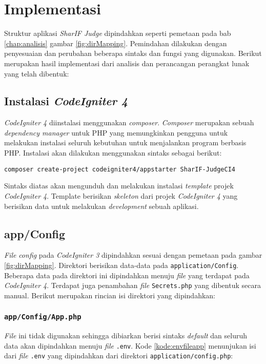 \section{Implementasi}
Struktur aplikasi \textit{SharIF Judge} dipindahkan seperti pemetaan pada bab \ref{chap:analisis} gambar \ref{fig:dirMapping}. Pemindahan dilakukan dengan penyesuaian dan perubahan beberapa sintaks dan fungsi yang digunakan. Berikut merupakan hasil implementasi dari analisis dan perancangan perangkat lunak yang telah dibentuk:
\subsection{Instalasi \textit{CodeIgniter 4}}
\textit{CodeIgniter 4} diinstalasi menggunakan \textit{composer}. \textit{Composer} merupakan sebuah \textit{dependency manager} untuk PHP yang memungkinkan pengguna untuk melakukan instalasi seluruh kebutuhan untuk menjalankan program berbasis PHP. Instalasi akan dilakukan menggunakan sintaks sebagai berikut:

\begin{center}
\verb|composer create-project codeigniter4/appstarter SharIF-JudgeCI4|
\end{center}

Sintaks diatas akan mengunduh dan melakukan instalasi \textit{template} projek \textit{CodeIgniter 4}. Template berisikan \textit{skeleton} dari projek \textit{CodeIgniter 4} yang berisikan data untuk melakukan \textit{development} sebuah aplikasi.

\subsection{app/Config}
\textit{File} \textit{config} pada \textit{CodeIgniter 3} dipindahkan sesuai dengan pemetaan pada gambar \ref{fig:dirMapping}. Direktori berisikan data-data pada \texttt{application/Config}. Beberapa data pada direktori ini dipindahkan menuju \textit{file} yang terdapat pada \textit{CodeIgniter 4}. Terdapat juga penambahan \textit{file} \texttt{Secrets.php} yang dibentuk secara manual. Berikut merupakan rincian isi direktori yang dipindahkan:
\subsubsection{\texttt{app/Config/App.php}}
\textit{File} ini tidak digunakan sehingga dibiarkan berisi sintaks \textit{default} dan seluruh data akan dipindahkan menuju \textit{file} \texttt{.env}. Kode \ref{kode:envfileapp} menunjukan isi dari \textit{file} \texttt{.env} yang dipindahkan dari direktori \texttt{application/config.php}:


